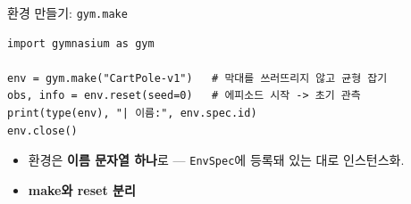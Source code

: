 \begin{frame}[fragile]{환경 만들기: \texttt{gym.make}}
\begin{lstlisting}
import gymnasium as gym

env = gym.make("CartPole-v1")   # 막대를 쓰러뜨리지 않고 균형 잡기
obs, info = env.reset(seed=0)   # 에피소드 시작 -> 초기 관측
print(type(env), "| 이름:", env.spec.id)
env.close()
\end{lstlisting}
  \begin{itemize}
    \item 환경은 \textbf{이름 문자열 하나}로 ---
      \texttt{EnvSpec}에 등록돼 있는 대로 인스턴스화.
    
    \item \textbf{make와 reset 분리}
  \end{itemize}

\end{frame}
